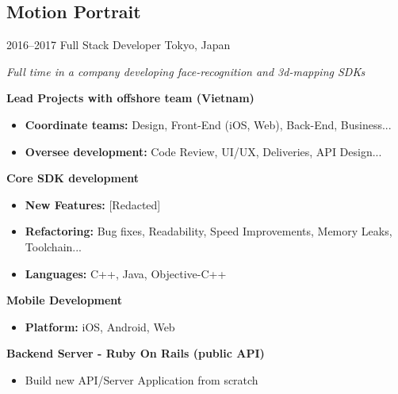\documentclass[]{template/friggeri-cv} %
\begin{document}
\subsection{Motion Portrait}
\begin{entrylist}


\entry
{2016--2017}
{Full Stack Developer}
{Tokyo, Japan}
{\emph{Full time in a company developing face-recognition and 3d-mapping SDKs}

\textbf{Lead Projects with offshore team (Vietnam)} 
\begin{itemize}
\item \textbf{Coordinate teams:} Design, Front-End (iOS, Web), Back-End, Business...
\item \textbf{Oversee development:} Code Review, UI/UX, Deliveries, API Design...
\end{itemize}
\textbf{Core SDK development} 
\begin{itemize}
\item \textbf{New Features:} [Redacted]
\item \textbf{Refactoring:} Bug fixes, Readability, Speed Improvements, Memory Leaks, Toolchain...
\item \textbf{Languages:} C++, Java, Objective-C++

\end{itemize}
\textbf{Mobile Development} 
\begin{itemize}
\item \textbf{Platform:} iOS, Android, Web
\end{itemize}

\textbf{Backend Server - Ruby On Rails (public API)} 
\begin{itemize}
\item Build new API/Server Application from scratch
\end{itemize}
}
\end{entrylist}



\end{document}
